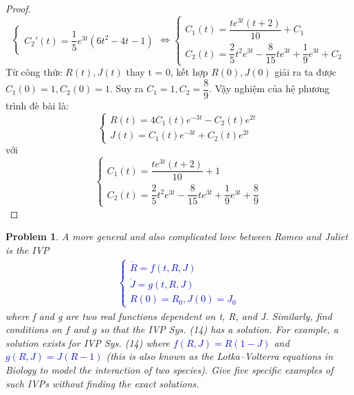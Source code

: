 \documentclass[a4paper]{article}
\newtheorem*{problem}{Problem}
\begin{document}
\begin{proof}
$$\begin{cases}
    C_2'(t) = \dfrac{1}{5}e^{3t}(6t^2 - 4t - 1)
\end{cases} \Leftrightarrow \begin{cases}
    C_1(t) = \dfrac{te^{3t}(t+2)}{10} + C_1 \\
    C_2(t) = \dfrac{2}{5}t^2e^{3t}-\dfrac{8}{15}te^{3t}+\dfrac{1}{9}e^{3t} + C_2
\end{cases}$$
Từ công thức $R(t), J(t)$ thay t = 0, kết hợp $R(0), J(0)$ giải ra ta được $C_1(0) = 1, C_2(0) = 1$. Suy ra $C_1 = 1, C_2 = \dfrac{8}{9}$. Vậy nghiệm của hệ phương trình đè bài là: 
$$
\begin{cases}
    R(t) = 4C_1(t)e^{-3t} - C_2(t)e^{2t} \\
    J(t) = C_1(t)e^{-3t} + C_2(t)e^{2t}
\end{cases}$$
với 
$$\begin{cases}
    C_1(t) = \dfrac{te^{3t}(t+2)}{10} + 1 \\
    C_2(t) = \dfrac{2}{5}t^2e^{3t}-\dfrac{8}{15}te^{3t}+\dfrac{1}{9}e^{3t} + \dfrac{8}{9}
\end{cases}$$
\end{proof}
\begin{problem}
A more general and also complicated love between Romeo and Juliet is the IVP
\textcolor{blue}{
\begin{align}\label{exercise-3-2}
    \begin{cases}
    \dot{R}=f(t,R,J)\\
    \dot{J}=g(t,R,J)\\
    R(0)=R_0,J(0)=J_0
    \end{cases}\tag{14} 
\end{align}
}
where f and g are two real functions dependent on t, R, and J. Similarly, find conditions on $f$ and
$g$ so that the IVP Sys. (14) has a solution. For example, a solution exists for IVP Sys. (14) where
\textcolor{blue}{$f(R, J) = R(1 - J)$} and \textcolor{blue}{$g(R, J) = J(R - 1)$} (this is also known as the Lotka–Volterra equations in Biology to model the interaction of two species). Give five specific examples of such IVPs without
finding the exact solutions.
\end{problem}
\end{document}
